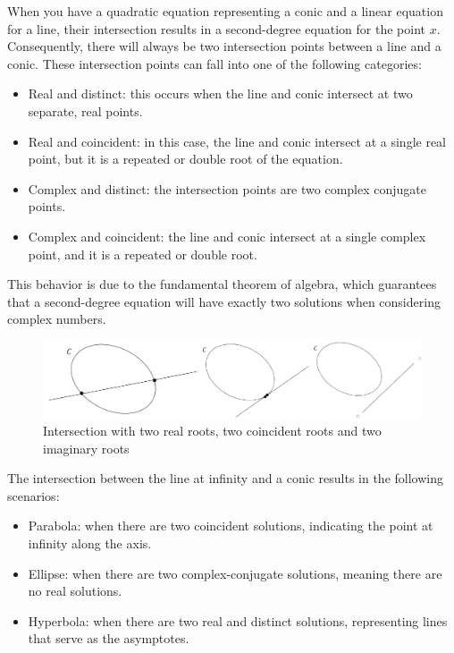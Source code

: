 When you have a quadratic equation representing a conic and a linear equation for a line, their intersection results in a second-degree equation for the point $x$. 
Consequently, there will always be two intersection points between a line and a conic. 
These intersection points can fall into one of the following categories:
\begin{itemize}
    \item Real and distinct: this occurs when the line and conic intersect at two separate, real points.
    \item Real and coincident: in this case, the line and conic intersect at a single real point, but it is a repeated or double root of the equation.
    \item Complex and distinct: the intersection points are two complex conjugate points.
    \item Complex and coincident: the line and conic intersect at a single complex point, and it is a repeated or double root.
\end{itemize}
This behavior is due to the fundamental theorem of algebra, which guarantees that a second-degree equation will have exactly two solutions when considering complex numbers.
\begin{figure}[H]
    \centering
    \includegraphics[width=0.75\linewidth]{images/intersection.png}
    \caption{Intersection with two real roots, two coincident roots and two imaginary roots}
\end{figure}
The intersection between the line at infinity and a conic results in the following scenarios:
\begin{itemize}
    \item Parabola: when there are two coincident solutions, indicating the point at infinity along the axis.
    \item Ellipse: when there are two complex-conjugate solutions, meaning there are no real solutions.
    \item Hyperbola: when there are two real and distinct solutions, representing lines that serve as the asymptotes.
\end{itemize}

